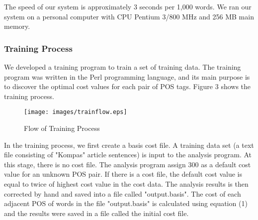 \documentclass[english]{nlp}
\begin{document}
The speed of our system is approximately 3 seconds per 1,000 words. 
We ran our system on a personal computer with CPU Pentium 3/800 MHz
and 256 MB main memory.

\subsubsection{Training Process}
We developed a training program to train a set of training data. The
training program was written in the Perl programming language, and its
main purpose is to discover the optimal cost values for each pair of POS tags.
Figure 3 shows the training process.

\begin{figure}[ht]
\begin{center}
\centerline{}
\texttt{[image: images/trainflow.eps]}
\caption{Flow of Training Process}
\label{fig:flowtrain}
\end{center}
\end{figure}

In the training process, we first create a basis cost file.
A training data set (a text file consisting of "Kompas" article sentences) is
input to the analysis program.
At this stage, there is no cost file. The analysis program assign 300 as
a default cost value for an unknown POS pair.
If there is a cost file, the default cost value is equal to twice of
highest cost value in the cost data.
The analysis results is then corrected by hand and saved into a file called
"output.basis".
The cost of each adjacent POS of words in the file "output.basis" is
calculated using equation (1) and the results were saved in a file
called the initial cost file.
\end{document}
